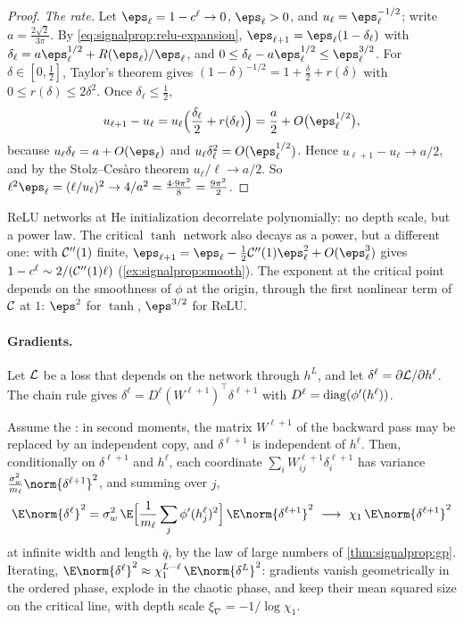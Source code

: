 \begin{refsection}
\begin{proof}
\emph{The rate.} Let $\eps_\ell=1-c^\ell\to0$, $\eps_\ell>0$, and $u_\ell=\eps_\ell^{-1/2}$; write $a=\frac{2\sqrt2}{3\pi}$. By \eqref{eq:signalprop:relu-expansion}, $\eps_{\ell+1}=\eps_\ell(1-\delta_\ell)$ with $\delta_\ell=a\eps_\ell^{1/2}+R(\eps_\ell)/\eps_\ell$, and $0\le\delta_\ell-a\eps_\ell^{1/2}\le\eps_\ell^{3/2}$. For $\delta\in[0,\frac12]$, Taylor's theorem gives $(1-\delta)^{-1/2}=1+\frac\delta2+r(\delta)$ with $0\le r(\delta)\le2\delta^2$. Once $\delta_\ell\le\frac12$,
\[
  u_{\ell+1}-u_\ell=u_\ell\Bigl(\frac{\delta_\ell}2+r(\delta_\ell)\Bigr)=\frac a2+O\bigl(\eps_\ell^{1/2}\bigr),
\]
because $u_\ell\delta_\ell=a+O(\eps_\ell)$ and $u_\ell\delta_\ell^2=O(\eps_\ell^{1/2})$. Hence $u_{\ell+1}-u_\ell\to a/2$, and by the Stolz--Ces\`aro theorem $u_\ell/\ell\to a/2$. So $\ell^2\eps_\ell=(\ell/u_\ell)^2\to4/a^2=\frac{4\cdot9\pi^2}{8}=\frac{9\pi^2}2$.
\end{proof}

ReLU networks at He initialization decorrelate polynomially: no depth scale, but a power law. The critical $\tanh$ network also decays as a power, but a different one: with $\mathcal{C}''(1)$ finite, $\eps_{\ell+1}=\eps_\ell-\frac12\signalpropC''(1)\eps_\ell^2+O(\eps_\ell^3)$ gives $1-c^\ell\sim2/(\mathcal{C}''(1)\ell)$ (\cref{ex:signalprop:smooth}). The exponent at the critical point depends on the smoothness of $\phi$ at the origin, through the first nonlinear term of $\mathcal{C}$ at $1$: $\eps^2$ for $\tanh$, $\eps^{3/2}$ for ReLU.

\paragraph{Gradients.} Let $\mathcal{L}$ be a loss that depends on the network through $h^L$, and let $\delta^\ell=\partial\mathcal{L}/\partial h^\ell$. The chain rule gives $\delta^\ell=D^\ell(W^{\ell+1})^\top\delta^{\ell+1}$ with $D^\ell=\operatorname{diag}(\phi'(h^\ell))$.

\begin{heuristic}
Assume the : in second moments, the matrix $W^{\ell+1}$ of the backward pass may be replaced by an independent copy, and $\delta^{\ell+1}$ is independent of $h^\ell$. Then, conditionally on $\delta^{\ell+1}$ and $h^\ell$, each coordinate $\sum_iW^{\ell+1}_{ij}\delta^{\ell+1}_i$ has variance $\frac{\sigma_w^2}{m_\ell}\norm{\delta^{\ell+1}}^2$, and summing over $j$,
\[
  \E\norm{\delta^\ell}^2=\sigma_w^2\,\E\Bigl[\frac1{m_\ell}\sum_{j}\phi'(h^\ell_j)^2\Bigr]\,\E\norm{\delta^{\ell+1}}^2\ \longrightarrow\ \chi_1\,\E\norm{\delta^{\ell+1}}^2
\]
at infinite width and length $\bar q$, by the law of large numbers of \cref{thm:signalprop:gp}. Iterating, $\E\norm{\delta^\ell}^2\approx\chi_1^{L-\ell}\,\E\norm{\delta^L}^2$: gradients vanish geometrically in the ordered phase, explode in the chaotic phase, and keep their mean squared size on the critical line, with depth scale $\xi_\nabla=-1/\log\chi_1$.\qedhere
\end{heuristic}


\end{refsection}
